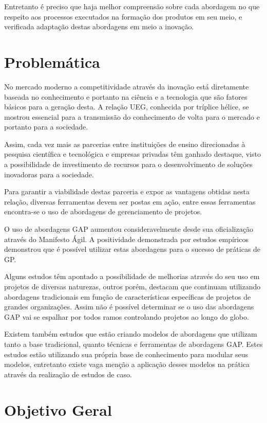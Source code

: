 Entretanto é preciso que haja melhor compreensão sobre cada abordagem no que respeito aos processos executados na formação dos produtos em seu meio, e verificada adaptação destas abordagens em meio a inovação.

\section{Problemática}

No mercado moderno a competitividade através da inovação está diretamente baseada no conhecimento e portanto na ciência e a tecnologia que são fatores básicos para a geração desta. A relação UEG, conhecida por tríplice hélice, se mostrou essencial para a transmissão do conhecimento de volta para o mercado e portanto para a sociedade.

Assim, cada vez mais as parcerias entre instituições de ensino direcionadas à pesquisa científica e tecnológica e empresas privadas têm ganhado destaque, visto a possibilidade de investimento de recursos para o desenvolvimento de soluções inovadoras para a sociedade.

Para garantir a viabilidade destas parceria e expor as vantagens obtidas nesta relação, diversas ferramentas devem ser postas em ação, entre essas ferramentas encontra-se o uso de abordagens de gerenciamento de projetos.

O uso de abordagens GAP aumentou consideravelmente desde sua oficialização através do Manifesto Ágil. A positividade demonstrada por estudos empíricos demonstrou que é possível utilizar estas abordagens para o sucesso de práticas de GP.

Alguns estudos têm apontado a possibilidade de melhorias através do seu uso em projetos de diversas naturezas, outros porém, destacam que continuam utilizando abordagens tradicionais em função de características específicas de projetos de grandes organizações. Assim não é possível determinar se o uso das abordagens GAP vai se espalhar por todos ramos controlando projetos ao longo do globo.

Existem também estudos que estão criando modelos de abordagens que utilizam tanto a base tradicional, quanto técnicas e ferramentas de abordagens GAP. Estes estudos estão utilizando sua própria base de conhecimento para modular seus modelos, entretanto existe vaga menção a aplicação desses modelos na prática através da realização de estudos de caso.

\section{Objetivo Geral}

